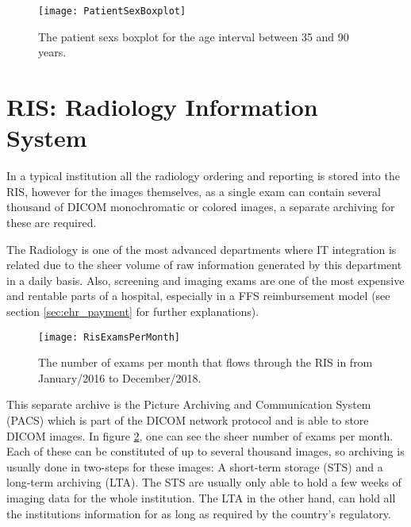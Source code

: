 \begin{center}
\begin{figure}
\begin{centering}
\texttt{[image: PatientSexBoxplot]}
\end{centering}
\caption{\label{fig:patient_sex_boxplot}The patient sexs boxplot for the age interval between 35 and 90 years.}
\end{figure}
\vspace*{-44pt}
\end{center}

\section{RIS: Radiology Information System}

In a typical institution all the radiology ordering and reporting is stored into the RIS, however for the images themselves, as a single exam can contain several thousand of DICOM monochromatic or colored images, a separate archiving for these are required. 

The Radiology is one of the most advanced departments where IT integration is related due to the sheer volume of raw information generated by this department in a daily basis. Also, screening and imaging exams are one of the most expensive and rentable parts of a hospital, especially in a FFS reimbursement model (see section \ref{sec:ehr_payment} for further explanations).

\begin{center}
\begin{figure}
\begin{centering}
\texttt{[image: RisExamsPerMonth]}
\end{centering}
\caption{\label{fig:ris_exams_per_month} The number of exams per month that flows through the RIS in \nomeHslShort{} from January/2016 to December/2018.}
\end{figure}
\vspace*{-44pt}
\end{center}

This separate archive is the Picture Archiving and Communication System (PACS) which is part of the DICOM network protocol and is able to store DICOM images\cite{clunie2000}\cite{mildenberger2002}. In figure \ref{fig:ris_exams_per_month}, one can see the sheer number of exams per month. Each of these can be constituted of up to several thousand images, so archiving is usually done in two-steps for these images: A short-term storage (STS) and a long-term archiving (LTA). The STS are usually only able to hold a few weeks of imaging data for the whole institution. The LTA in the other hand, can hold all the institutions information for as long as required by the country's regulatory.

